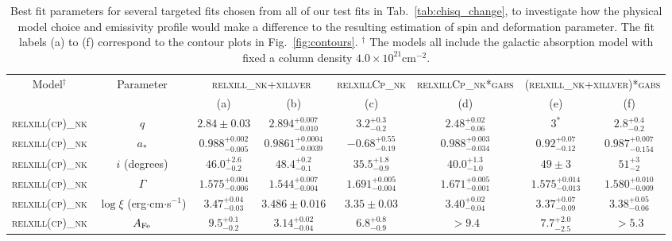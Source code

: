 \documentclass[11pt,a4paper,pdftex]{article}
\begin{document}
\begin{table*}%
\begin{center}
{\tiny
\caption{Best fit parameters for several targeted fits chosen from all of our test fits in Tab.~\ref{tab:chisq_change}, to investigate how the physical model choice and emissivity profile would make a difference to the resulting estimation of spin and deformation parameter. The fit labels (a) to (f) correspond to the contour plots in Fig.~\ref{fig:contours}. $^\dagger$ The models all include the galactic absorption model with fixed a column density $4.0\times 10^{21}$cm$^{-2}$. \label{tab:parameters}}
{\renewcommand{\arraystretch}{1.3}%
\begin{tabular}{cc|cc|cc|cc}\hline \hline
Model$^\dagger$ & Parameter &\multicolumn{2}{c|}{\textsc{relxill\_nk+xillver}} & \textsc{relxillCp\_nk} & \textsc{relxillCp\_nk*gabs} &\multicolumn{2}{c}{\textsc{(relxill\_nk+xillver)*gabs}} \\
&& (a) & (b) &(c)&(d)&(e)&(f)\\
\hline
\textsc{relxill(cp)\_nk}&$q$& $2.84\pm0.03$ & $2.894^{+0.007}_{-0.010}$ & $3.2^{+0.3}_{-0.2}$ & $2.48^{+0.02}_{-0.06}$ & $3^*$ & $2.8^{+0.4}_{-0.2}$  \\
\textsc{relxill(cp)\_nk}&$a_*$& $0.988^{+0.002}_{-0.005}$ & $0.9861^{+0.0004}_{-0.0039}$  & $-0.68^{+0.55}_{-0.19}$ & $0.988^{+0.003}_{-0.034}$ & $0.92^{+0.07}_{-0.12}$ & $0.987^{+0.007}_{-0.154}$ \\
\textsc{relxill(cp)\_nk}&$i$ (degrees)& $46.0^{+2.6}_{-0.2}$ & $48.4^{+0.2}_{-0.1}$ & $35.5^{+1.8}_{-0.9}$ & $40.0^{+1.3}_{-1.0}$ & $49\pm3$ & $51^{+3}_{-2}$ \\
\textsc{relxill(cp)\_nk}&$\Gamma$& $1.575^{+0.004}_{-0.006}$ & $1.544^{+0.007}_{-0.004}$ & $1.691^{+0.005}_{-0.004}$ & $1.671^{+0.005}_{-0.001}$ & $1.575^{+0.014}_{-0.013}$ & $1.580^{+0.010}_{-0.009}$ \\
\textsc{relxill(cp)\_nk}&$\log \xi$ (erg$\cdot$cm$\cdot$s$^{-1}$) & $3.47^{+0.04}_{-0.03}$ & $3.486\pm0.016$ & $3.35\pm0.03$ & $3.40^{+0.02}_{-0.04}$ & $3.37^{+0.07}_{-0.09}$ & $3.38^{+0.05}_{-0.06}$ \\
\textsc{relxill(cp)\_nk}&$A_{\rm Fe}$& $9.5^{+0.1}_{-0.2}$ & $3.14^{+0.02}_{-0.04}$ & $6.8^{+0.8}_{-0.9}$ & $>9.4$ & $7.7^{+2.0}_{-2.5}$ & $>5.3$ \\

\end{tabular}}}
\end{center}
\end{table*}
\end{document}
